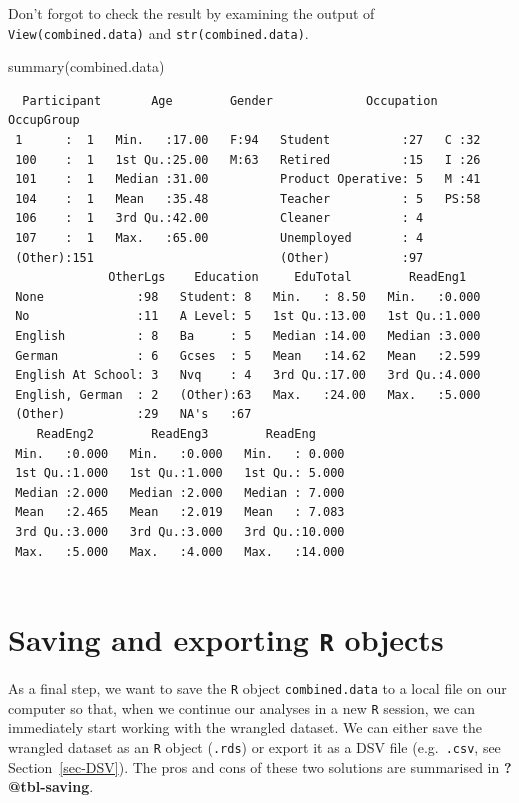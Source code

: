 \documentclass[
  letterpaper,
  DIV=11,
  numbers=noendperiod]{scrreprt}
\newenvironment{Shaded}{\begin{snugshade}}{\end{snugshade}}
\newcommand{\FunctionTok}[1]{\textcolor[rgb]{0.28,0.35,0.67}{#1}}
\newcommand{\NormalTok}[1]{\textcolor[rgb]{0.00,0.23,0.31}{#1}}
\begin{document}
Don't forgot to check the result by examining the output of
\texttt{View(combined.data)} and \texttt{str(combined.data)}.

\begin{Shaded}
\begin{Highlighting}[]
\FunctionTok{summary}\NormalTok{(combined.data)}
\end{Highlighting}
\end{Shaded}

\begin{verbatim}
  Participant       Age        Gender             Occupation OccupGroup
 1      :  1   Min.   :17.00   F:94   Student          :27   C :32     
 100    :  1   1st Qu.:25.00   M:63   Retired          :15   I :26     
 101    :  1   Median :31.00          Product Operative: 5   M :41     
 104    :  1   Mean   :35.48          Teacher          : 5   PS:58     
 106    :  1   3rd Qu.:42.00          Cleaner          : 4             
 107    :  1   Max.   :65.00          Unemployed       : 4             
 (Other):151                          (Other)          :97             
              OtherLgs    Education     EduTotal        ReadEng1    
 None             :98   Student: 8   Min.   : 8.50   Min.   :0.000  
 No               :11   A Level: 5   1st Qu.:13.00   1st Qu.:1.000  
 English          : 8   Ba     : 5   Median :14.00   Median :3.000  
 German           : 6   Gcses  : 5   Mean   :14.62   Mean   :2.599  
 English At School: 3   Nvq    : 4   3rd Qu.:17.00   3rd Qu.:4.000  
 English, German  : 2   (Other):63   Max.   :24.00   Max.   :5.000  
 (Other)          :29   NA's   :67                                  
    ReadEng2        ReadEng3        ReadEng      
 Min.   :0.000   Min.   :0.000   Min.   : 0.000  
 1st Qu.:1.000   1st Qu.:1.000   1st Qu.: 5.000  
 Median :2.000   Median :2.000   Median : 7.000  
 Mean   :2.465   Mean   :2.019   Mean   : 7.083  
 3rd Qu.:3.000   3rd Qu.:3.000   3rd Qu.:10.000  
 Max.   :5.000   Max.   :4.000   Max.   :14.000  
                                                 
\end{verbatim}

\section{\texorpdfstring{Saving and exporting \texttt{R}
objects~}{Saving and exporting R objects~}}\label{sec-ExportingRObjects}

As a final step, we want to save the \texttt{R} object
\texttt{combined.data} to a local file on our computer so that, when we
continue our analyses in a new \texttt{R} session, we can immediately
start working with the wrangled dataset. We can either save the wrangled
dataset as an \texttt{R} object (\texttt{.rds}) or export it as a DSV
file (e.g.~\texttt{.csv}, see Section~\ref{sec-DSV}). The pros and cons
of these two solutions are summarised in \textbf{?@tbl-saving}.
\end{document}
